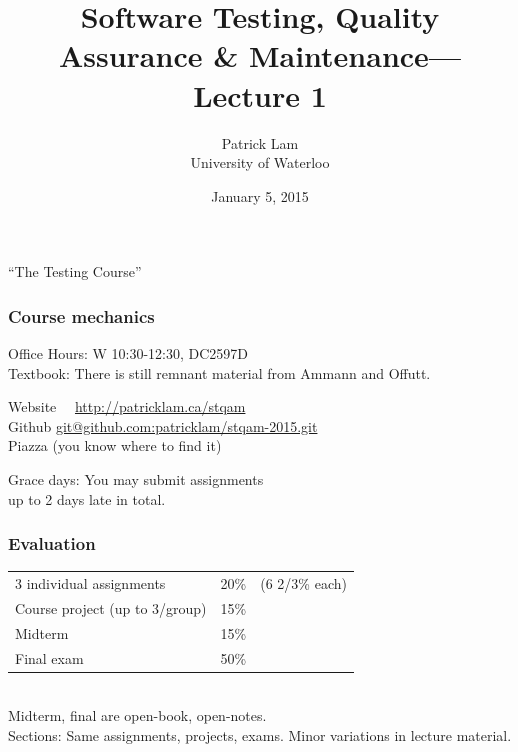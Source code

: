 \documentclass{beamer}
\title{Software Testing, Quality Assurance \& Maintenance---Lecture 1}
\author{Patrick Lam\\University of Waterloo}
\date{January 5, 2015}
\newenvironment{changemargin}[1]{%
  \begin{list}{}{%
    \setlength{\topsep}{0pt}%
    \setlength{\leftmargin}{#1}%
    \setlength{\rightmargin}{1em}
    \setlength{\listparindent}{\parindent}%
    \setlength{\itemindent}{\parindent}%
    \setlength{\parsep}{\parskip}%
  }%
  \item[]}{\end{list}}
\begin{document}
\begin{frame}
  \titlepage
\end{frame}

\begin{frame}
  \begin{center}
  \Huge ``The Testing Course''
  \end{center}
\end{frame}

\begin{frame}
\frametitle{Course mechanics}

\Large

\begin{changemargin}{1em}
  Office Hours: W 10:30-12:30, DC2597D\\[1em]
  
  Textbook: There is still remnant material from Ammann and
Offutt.\\[1em]

{\small
  \begin{tabbing}
Website~~ \= \url{http://patricklam.ca/stqam}\\[1em]
Github \> \url{git@github.com:patricklam/stqam-2015.git}\\[1em]
Piazza \> (you know where to find it)
  \end{tabbing}
}

  Grace days: You may submit assignments \\ up to 2 days late in total.
\end{changemargin}

\end{frame}

\begin{frame}
  \frametitle{Evaluation}
  \Large
\begin{changemargin}{2em}
\begin{tabular}{lrl}
3 individual assignments & 20\% & (6 2/3\% each) \\
Course project (up to 3/group) & 15\% \\
Midterm & 15\% \\
Final exam & 50\% \\
\end{tabular}~\\[1em]

Midterm, final are open-book, open-notes.\\[1em]

Sections: Same assignments, projects, exams. Minor variations in lecture material.

\end{changemargin}

\end{frame}
\end{document}
